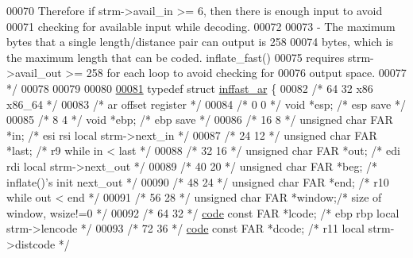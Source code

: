 \begin{DoxyCode}
{{00070 \textcolor{comment}{      Therefore if strm->avail\_in >= 6, then there is enough input to avoid}
00071 \textcolor{comment}{      checking for available input while decoding.}
00072 \textcolor{comment}{}
00073 \textcolor{comment}{    - The maximum bytes that a single length/distance pair can output is 258}
00074 \textcolor{comment}{      bytes, which is the maximum length that can be coded.  inflate\_fast()}
00075 \textcolor{comment}{      requires strm->avail\_out >= 258 for each loop to avoid checking for}
00076 \textcolor{comment}{      output space.}
00077 \textcolor{comment}{ */}
00078 
00079 
00080 
\hyperlink{structinffast__ar}{00081}     \textcolor{keyword}{typedef} \textcolor{keyword}{struct }\hyperlink{structinffast__ar}{inffast\_ar} \{
00082 \textcolor{comment}{/* 64   32                               x86  x86\_64 */}
00083 \textcolor{comment}{/* ar offset                              register */}
00084 \textcolor{comment}{/*  0    0 */} \textcolor{keywordtype}{void} *esp;                \textcolor{comment}{/* esp save */}
00085 \textcolor{comment}{/*  8    4 */} \textcolor{keywordtype}{void} *ebp;                \textcolor{comment}{/* ebp save */}
00086 \textcolor{comment}{/* 16    8 */} \textcolor{keywordtype}{unsigned} \textcolor{keywordtype}{char} FAR *in;    \textcolor{comment}{/* esi rsi  local strm->next\_in */}
00087 \textcolor{comment}{/* 24   12 */} \textcolor{keywordtype}{unsigned} \textcolor{keywordtype}{char} FAR *last;  \textcolor{comment}{/*     r9   while in < last */}
00088 \textcolor{comment}{/* 32   16 */} \textcolor{keywordtype}{unsigned} \textcolor{keywordtype}{char} FAR *out;   \textcolor{comment}{/* edi rdi  local strm->next\_out */}
00089 \textcolor{comment}{/* 40   20 */} \textcolor{keywordtype}{unsigned} \textcolor{keywordtype}{char} FAR *beg;   \textcolor{comment}{/*          inflate()'s init next\_out */}
00090 \textcolor{comment}{/* 48   24 */} \textcolor{keywordtype}{unsigned} \textcolor{keywordtype}{char} FAR *end;   \textcolor{comment}{/*     r10  while out < end */}
00091 \textcolor{comment}{/* 56   28 */} \textcolor{keywordtype}{unsigned} \textcolor{keywordtype}{char} FAR *window;\textcolor{comment}{/*          size of window, wsize!=0 */}
00092 \textcolor{comment}{/* 64   32 */} \hyperlink{structcode}{code} \textcolor{keyword}{const} FAR *lcode;    \textcolor{comment}{/* ebp rbp  local strm->lencode */}
00093 \textcolor{comment}{/* 72   36 */} \hyperlink{structcode}{code} \textcolor{keyword}{const} FAR *dcode;    \textcolor{comment}{/*     r11  local strm->distcode */}
}}
\end{DoxyCode}
